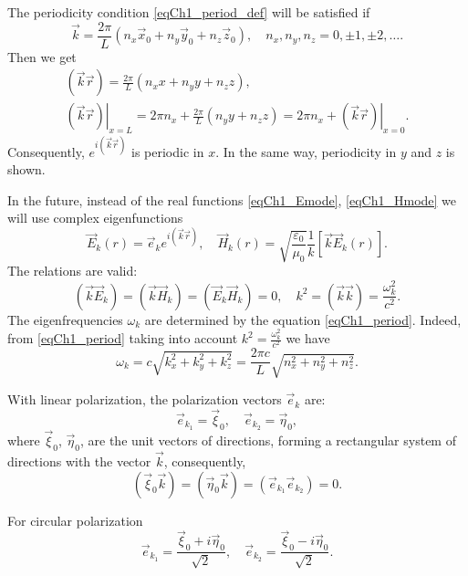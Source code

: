 The periodicity condition \eqref{eqCh1_period_def} will be satisfied
if 
\begin{equation}
\vec{k} = \frac{2 \pi}{L}\left(n_x \vec{x}_0
+ n_y \vec{y}_0
+ n_z \vec{z}_0
\right),
\quad
n_x, n_y, n_z = 0, \pm 1, \pm 2, \dots .
\label{eqCh1_period}
\end{equation}
Then we get
\begin{eqnarray}
\left(\vec{k}\vec{r}\right) = \frac{2 \pi}{L}\left(n_x x
+ n_y y
+ n_z z
\right),
\nonumber \\
\left.\left(\vec{k}\vec{r}\right)\right|_{x = L} = 2 \pi n_x + \frac{2 \pi}{L}\left(n_y y
+ n_z z
\right) = 
2 \pi n_x + \left.\left(\vec{k}\vec{r}\right)\right|_{x = 0}.
\end{eqnarray}
Consequently,    
$e^{i\left(\vec{k}\vec{r}\right)}$
is periodic in $x$. In the same way, periodicity in $y$ and $z$ is shown.

In the future, instead of the real functions \eqref{eqCh1_Emode}, 
\eqref{eqCh1_Hmode} we will use
complex eigenfunctions 
\begin{equation}
\vec{E}_k\left(r\right) = \vec{e}_k e^{i \left( \vec{k}\vec{r}\right)},
\quad
\vec{H}_k\left(r\right) = \sqrt{\frac{\varepsilon_0}{\mu_0}}\frac{1}{k}
\left[\vec{k}\vec{E}_k\left(r\right)\right].
\label{eqCh1_EHmode}
\end{equation}
The relations are valid:
\[
\left(\vec{k}\vec{E}_k\right) = 
\left(\vec{k}\vec{H}_k\right) = 
\left(\vec{E}_k\vec{H}_k\right) = 0,
\quad
k^2 = \left(\vec{k}\vec{k}\right) = 
\frac{\omega_k^2}{c^2}.
\]
The eigenfrequencies $\omega_k$ are determined by the equation
\eqref{eqCh1_period}. Indeed, from \eqref{eqCh1_period} taking into account
$k^2 = \frac{\omega_k^2}{c^2}$ we have 
\begin{equation}
\omega_k = c \sqrt{k_x^2 + k_y^2 + k_z^2} = 
\frac{2 \pi c}{L} \sqrt{n_x^2 + n_y^2 + n_z^2}.
\end{equation}

With linear polarization, the polarization vectors $\vec{e}_k$ are:
\[
\vec{e}_{k_1} = \vec{\xi}_0,
\quad
\vec{e}_{k_2} = \vec{\eta}_0,
\]
where $\vec{\xi}_0$, $\vec{\eta}_0$, are the unit vectors of directions, forming a 
rectangular system of directions with the vector $\vec{k}$, consequently, 
\[
\left(\vec{\xi}_0\vec{k}\right) =
\left(\vec{\eta}_0\vec{k}\right) =
\left(\vec{e}_{k_1}\vec{e}_{k_2}\right) = 0.
\]

For circular polarization
\[
\vec{e}_{k_1} = \frac{\vec{\xi}_0 + i \vec{\eta}_0}{\sqrt{2}},
\quad
\vec{e}_{k_2} = \frac{\vec{\xi}_0 - i \vec{\eta}_0}{\sqrt{2}}.
\]

